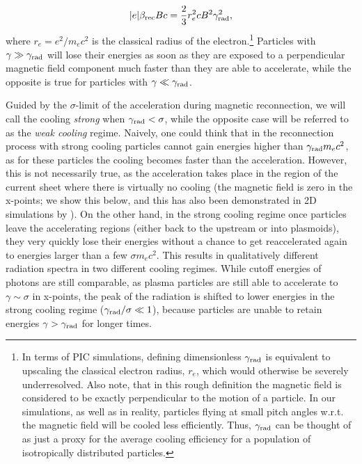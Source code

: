 \begin{equation}
    |e|\beta_{\rm rec}B c = \frac{2}{3}r_e^2 c B^2 \gamma_{\rm rad}^2,
\end{equation}
\noindent where $r_e=e^2/m_e c^2$ is the classical radius of the electron.\footnote{In terms of PIC simulations, defining dimensionless $\gamma_{\rm rad}$ is equivalent to upscaling the classical electron radius, $r_e$, which would otherwise be severely underresolved. Also note, that in this rough definition the magnetic field is considered to be exactly perpendicular to the motion of a particle. In our simulations, as well as in reality, particles flying at small pitch angles w.r.t. the magnetic field will be cooled less efficiently. Thus, $\gamma_{\rm rad}$ can be thought of as just a proxy for the average cooling efficiency for a population of isotropically distributed particles.} Particles with $\gamma \gg \gamma_{\rm rad}$ will lose their energies as soon as they are exposed to a perpendicular magnetic field component much faster than they are able to accelerate, while the opposite is true for particles with $\gamma \ll \gamma_{\rm rad}$. 

Guided by the $\sigma$-limit of the acceleration during magnetic reconnection, we will call the cooling \emph{strong} when $\gamma_{\rm rad} < \sigma$, while the opposite case will be referred to as the \emph{weak cooling} regime. Naively, one could think that in the reconnection process with strong cooling particles cannot gain energies higher than $\gamma_{\rm rad} m_e c^2$, as for these particles the cooling becomes faster than the acceleration. However, this is not necessarily true, as the acceleration takes place in the region of the current sheet where there is virtually no cooling (the magnetic field is zero in the x-points; we show this below, and this has also been demonstrated in 2D simulations by \citealt{2019ApJ...877...53H}). On the other hand, in the strong cooling regime once particles leave the accelerating regions (either back to the upstream or into plasmoids), they very quickly lose their energies without a chance to get reaccelerated again to energies larger than a few $\sigma m_e c^2$. This results in qualitatively different radiation spectra in two different cooling regimes. While cutoff energies of photons are still comparable, as plasma particles are still able to accelerate to $\gamma\sim \sigma$ in x-points, the peak of the radiation is shifted to lower energies in the strong cooling regime ($\gamma_{\rm rad}/\sigma \ll 1$), because particles are unable to retain energies $\gamma>\gamma_{\rm rad}$ for longer times.

